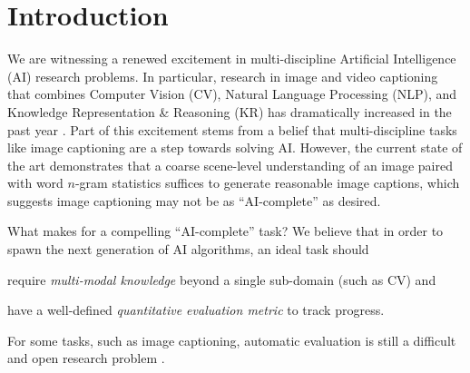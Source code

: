 \section{Introduction}
\label{sec:intro}


We are witnessing a renewed excitement in multi-discipline Artificial Intelligence (AI) research problems. In particular, research in image and video captioning that combines Computer Vision (CV),
Natural Language Processing (NLP), and Knowledge Representation \& Reasoning (KR) has dramatically increased in the past year \cite{captioning_msr,captioning_xinlei,captioning_berkeley,captioning_baidu_ucla,
captioning_toronto,captioning_stanford,captioning_google}. Part of this excitement stems from a belief that multi-discipline tasks like image captioning are a step towards solving AI. However, the current state of the art demonstrates that a coarse scene-level understanding of an image paired with word $n$-gram statistics suffices to generate reasonable image captions, which suggests image captioning may not be as ``AI-complete'' as desired.


What makes for a compelling ``AI-complete'' task?
We believe that in order to spawn the next generation of AI algorithms,
an ideal task should
%
\begin{inparaenum}[(i)]
\item require \emph{multi-modal knowledge} beyond a single sub-domain (such as CV) and
\item have a well-defined \emph{quantitative evaluation metric} to track progress.
\end{inparaenum}
For some tasks, such as image captioning, automatic evaluation is still a difficult and
open research problem \cite{cider, elliott2014comparing, hodosh2013framing}.



